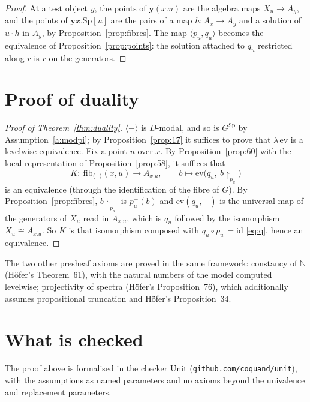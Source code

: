 \documentclass[11pt]{amsart}
\theoremstyle{definition}
\theoremstyle{remark}
\newcommand{\Sp}{\mathrm{Sp}}
\newcommand{\yo}{\mathbf{y}}
\newcommand{\pres}[1]{\langle #1\rangle}
\newcommand{\fib}{\mathrm{fib}}
\begin{document}
\begin{proof}
At a test object $y$, the points of $\yo(x.u)$ are the algebra maps
$X_u\to A_y$, and the points of $\yo x.\Sp[u]$ are the pairs of a map
$h\colon A_x\to A_y$ and a solution of $u\cdot h$ in $A_y$, by
Proposition~\ref{prop:fibres}. The map $\langle p_u,q_u\rangle$ becomes the
equivalence of Proposition~\ref{prop:points}: the solution attached to $q_u$
restricted along $r$ is $r$ on the generators.
\end{proof}

\section{Proof of duality}\label{sec:proof}

\begin{proof}[Proof of Theorem~\ref{thm:duality}]
$\pres{-}$ is $D$-modal, and so is $G^{\Sp}$ by Assumption~\ref{a:modpi};
by Proposition~\ref{prop:17} it suffices to prove that $\lambda\,\mathrm{ev}$
is a levelwise equivalence. Fix a point $u$ over $x$. By
Proposition~\ref{prop:60} with the local representation of
Proposition~\ref{prop:58}, it suffices that
\[
K\colon\ \fib_{\pres{-}}(x,u)\longrightarrow A_{x.u},\qquad
b\mapsto \mathrm{ev}\bigl(q_u,\ b\!\restriction_{p_u}\bigr)
\]
is an equivalence (through the identification of the fibre of $G$). By
Proposition~\ref{prop:fibres}, $b\!\restriction_{p_u}$ is $p_u^+(b)$ and
$\mathrm{ev}(q_u,-)$ is the universal map of the generators of $X_u$ read in
$A_{x.u}$, which is $q_u$ followed by the isomorphism $X_u\cong A_{x.u}$.
So $K$ is that isomorphism composed with $q_u\circ p_u^+=\mathrm{id}$
\eqref{eq:q}, hence an equivalence.
\end{proof}

The two other presheaf axioms are proved in the same framework: constancy
of $\mathbb N$ (H\"ofer's Theorem~61), with the natural numbers of the model
computed levelwise; projectivity of spectra (H\"ofer's Proposition~76),
which additionally assumes propositional truncation and H\"ofer's
Proposition~34.

\section{What is checked}\label{sec:checked}

The proof above is formalised in the checker Unit
(\texttt{github.com/coquand/unit}), with the assumptions as named
parameters and no axioms beyond the univalence and replacement parameters.
\end{document}
